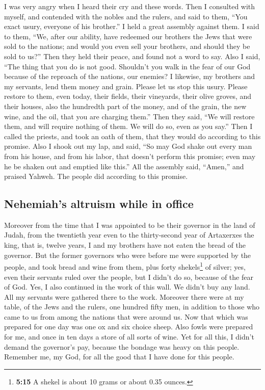  I was very angry when I heard their cry and these words.
 Then I consulted with myself, and contended with the
nobles and the rulers, and said to them, ``You exact usury, everyone of
his brother.'' I held a great assembly against them.  I
said to them, ``We, after our ability, have redeemed our brothers the
Jews that were sold to the nations; and would you even sell your
brothers, and should they be sold to us?'' Then they held their peace,
and found not a word to say.  Also I said, ``The thing
that you do is not good. Shouldn't you walk in the fear of our God
because of the reproach of the nations, our enemies?  I
likewise, my brothers and my servants, lend them money and grain. Please
let us stop this usury.  Please restore to them, even
today, their fields, their vineyards, their olive groves, and their
houses, also the hundredth part of the money, and of the grain, the new
wine, and the oil, that you are charging them.''  Then
they said, ``We will restore them, and will require nothing of them. We
will do so, even as you say.'' Then I called the priests, and took an
oath of them, that they would do according to this promise.
 Also I shook out my lap, and said, ``So may God shake
out every man from his house, and from his labor, that doesn't perform
this promise; even may he be shaken out and emptied like this.'' All the
assembly said, ``Amen,'' and praised Yahweh. The people did according to
this promise.

\hypertarget{nehemiahs-altruism-while-in-office}{%
\subsection{Nehemiah's altruism while in
office}\label{nehemiahs-altruism-while-in-office}}

 Moreover from the time that I was appointed to be their
governor in the land of Judah, from the twentieth year even to the
thirty-second year of Artaxerxes the king, that is, twelve years, I and
my brothers have not eaten the bread of the governor. 
But the former governors who were before me were supported by the
people, and took bread and wine from them, plus forty shekels\footnote{\textbf{5:15}
  A shekel is about 10 grams or about 0.35 ounces.} of silver; yes, even
their servants ruled over the people, but I didn't do so, because of the
fear of God.  Yes, I also continued in the work of this
wall. We didn't buy any land. All my servants were gathered there to the
work.  Moreover there were at my table, of the Jews and
the rulers, one hundred fifty men, in addition to those who came to us
from among the nations that were around us.  Now that
which was prepared for one day was one ox and six choice sheep. Also
fowls were prepared for me, and once in ten days a store of all sorts of
wine. Yet for all this, I didn't demand the governor's pay, because the
bondage was heavy on this people.  Remember me, my God,
for all the good that I have done for this people.

